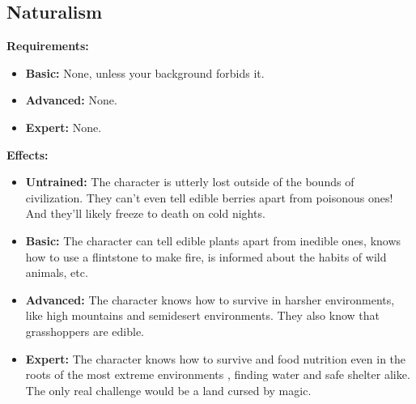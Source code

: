 \subsection{Naturalism}
\begin{table}[!ht]
\centering
{}
\end{table}
\textbf{Requirements:}
\begin{itemize}
	\item \textbf{Basic:} None, unless your background forbids it.
	\item \textbf{Advanced:} None.
	\item \textbf{Expert:} None.
\end{itemize}
\textbf{Effects:}
\begin{itemize}
	\item \textbf{Untrained:} The character is utterly lost outside of the bounds of civilization. They can't even tell edible berries apart from poisonous ones! And they'll likely freeze to death on cold nights.
	\item \textbf{Basic:} The character can tell edible plants apart from inedible ones, knows how to use a flintstone to make fire, is informed about the habits of wild animals, etc.
	\item \textbf{Advanced:} The character knows how to survive in harsher environments, like high mountains and semidesert environments. They also know that grasshoppers are edible.
	\item \textbf{Expert:} The character knows how to survive and food nutrition even in the roots of the most extreme environments , finding water and safe shelter alike. The only real challenge would be a land cursed by magic.
\end{itemize}\newpage
